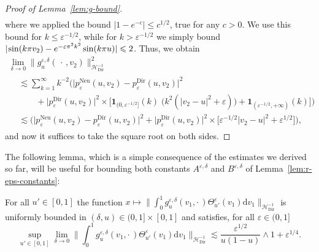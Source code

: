 \documentclass[AHL,Unicode,longabstracts]{cedram}
\DeclareMathOperator{\Dir}{Dir}
\DeclareMathOperator{\Neu}{Neu}
\newcommand{\mc}[1]{{\mathcal #1}}
\renewcommand{\mc}[1]{{\mathcal #1}}
\renewcommand{\leq}{\leqslant}
\renewcommand{\le}{\leqslant}
\newcommand*{\dd}{\mathrm{d}}
\newcommand*{\dv}{\dd v}
\newcommand*{\Mk}{\mkern -2mu}
\begin{document}
\begin{proof}[Proof of Lemma~\ref{lem:g-bound}]
\begin{align*}
\end{align*}
where we applied the bound $|1 - e^{-c}| \le c^{1/2}$, true for any $c>0$. We use this bound for $k \leq \varepsilon^{- 1/2}$, while for $k > \varepsilon^{- 1/2}$ we simply bound $|\Mk\sin (k \pi v_2) - e^{- \varepsilon \pi^2 k^2} \sin (k \pi u)| \le 2$. Thus, we obtain
\begin{multline*}
\lim_{\delta \rightarrow 0} \big\| g^{\varepsilon, \delta}_u (\,\cdot\,, v_2) \big\|_{\mc H_{\Dir}^{- 1}}^2\\
\begin{aligned}
& \lesssim \sum_{k = 1}^{\infty} k^{- 2} \bigg(\big| p^{\Neu}_{\varepsilon} (u, v_2) - p^{\Dir}_{\varepsilon} (u, v_2) \big|^2 \\
& \qquad + \big|p^{\Dir}_{\varepsilon} (u, v_2)\big|^2 \times \big[\mathbf{1}_{(0, \varepsilon^{- 1/2}]}(k)\; \big(k^2 (| v_2 - u |^2 + \varepsilon)\big) +\mathbf{1}_{(\varepsilon^{- 1/2},+\infty)}(k)\big]\bigg)\\
& \lesssim \Big(\big| p^{\Neu}_{\varepsilon} (u, v_2) - p^{\Dir}_{\varepsilon} (u, v_2) \big|^2 + \big|p^{\Dir}_{\varepsilon} (u, v_2)\big|^2 \times \big[\varepsilon^{- 1/2} | v_2 - u |^2 + \varepsilon^{1/2}\big]\Big),
\end{aligned}
\end{multline*}
and now it suffices to take the square root on both sides.
\end{proof}

The following lemma, which is a simple consequence of the estimates we derived so far, will be useful for bounding both constants $A^{\varepsilon, \delta}$ and $B^{\varepsilon, \delta}$ of Lemma~\ref{lem:r-eps-constants}:

\begin{lemm}\label{lem:g-theta-bound}
For all $u' \in [0,1]$ the function $x\mapsto \big\| \int_0^1 g^{\varepsilon, \delta}_u (v_1, \cdot\,) \Theta^{\varepsilon}_{u'} (v_1) \dv_1 \big\|_{\mc H_{\Dir}^{-1}}$ is uniformly bounded in $(\delta,u) \in (0,1] \times [0,1]$ and satisfies, for all $\varepsilon \in (0,1]$
\[
\sup_{u' \in [0, 1]} \lim_{\delta \rightarrow 0} \bigg\| \int_0^1 g^{\varepsilon, \delta}_u (v_1, \cdot\,) \Theta^{\varepsilon}_{u'} (v_1) \dv_1 \bigg\|_{\mc H_{\Dir}^{- 1}} \lesssim \frac{\varepsilon^{1/2}}{u (1 - u)} \wedge 1 + \varepsilon^{1/4}.
\]
\end{lemm}
\end{document}
